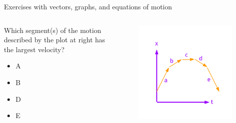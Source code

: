 \documentclass{beamer}
\begin{document}
\begin{frame}{Exercises with vectors, graphs, and equations of motion}
\begin{columns}[T]
\begin{column}{0.4\textwidth}
\small
Which segment(s) of the motion described by the plot at right has the largest velocity?
\begin{itemize}
\item A
\item B
\item D
\item E
\end{itemize}
\end{column}
\begin{column}{0.6\textwidth}
\begin{figure}
\centering
\includegraphics[width=\textwidth,trim=0cm 0cm 0cm 1.5cm,clip=true]{figures/Vectors2.pdf}
\end{figure}
\end{column}
\end{columns}
\end{frame}
\end{document}
